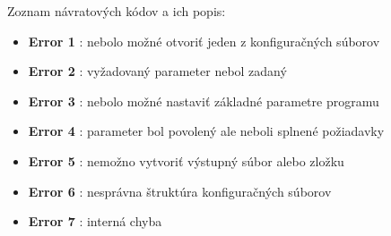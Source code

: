 Zoznam návratových kódov a ich popis:

\bigskip

\begin{itemize}
    \item \textbf{Error 1} : nebolo možné otvoriť jeden z konfiguračných súborov
    \item \textbf{Error 2} : vyžadovaný parameter nebol zadaný
    \item \textbf{Error 3} : nebolo možné nastaviť základné parametre programu
    \item \textbf{Error 4} : parameter bol povolený ale neboli splnené požiadavky
    \item \textbf{Error 5} : nemožno vytvoriť výstupný súbor alebo zložku
    \item \textbf{Error 6} : nesprávna štruktúra konfiguračných súborov
    \item \textbf{Error 7} : interná chyba
\end{itemize}
